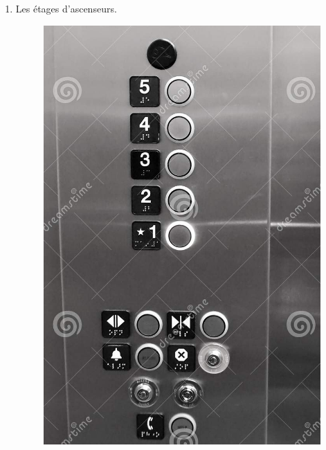 \begin{multicols}{3}
\begin{enumerate}
  \item[3.] Les étages d'ascenseurs.
  \begin{figure}[H]
    \centering
    \includegraphics[width=0.8\linewidth]{5x3-nombres-relatifs-1-intro/c-ascenseur.png}
  \end{figure} \columnbreak


\end{enumerate}
\end{multicols}
